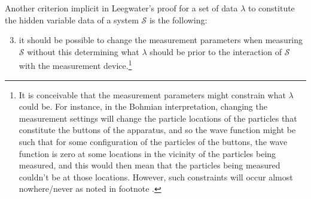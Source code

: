 \documentclass[12pt]{report}
\begin{document}
Another criterion implicit in Leegwater's proof for a set of data $\lambda$ to constitute the hidden variable data of a system $\mathcal{S}$ is the following: 
\begin{enumerate}
	\setcounter{enumi}{2}
\item \label{hidden2} it should be possible to change the measurement parameters when measuring $\mathcal{S}$ without this determining what $\lambda$ should be prior to the interaction of $\mathcal{S}$ with the measurement device.\footnote{It is conceivable that the measurement parameters might constrain what $\lambda$ could be. For instance, in the Bohmian interpretation, changing the measurement settings will change the particle locations of the particles that constitute the buttons of the apparatus, and so the wave function might be such that for some configuration of the particles of the buttons, the wave function is zero at some locations in the vicinity of the particles being measured, and this would then mean that the particles being measured couldn't be at those locations. However, such constraints will occur almost nowhere/never as noted in footnote .}
\end{enumerate} 
\end{document}
